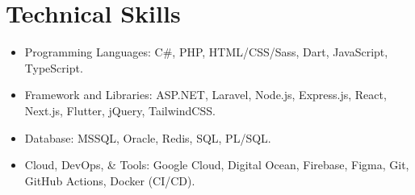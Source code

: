 \section{Technical Skills}

\begin{itemize}[itemsep=1pt, parsep=0pt, topsep=0pt]
    \item Programming Languages: C\#, PHP, HTML/CSS/Sass, Dart, JavaScript, TypeScript.
    \item Framework and Libraries: ASP.NET, Laravel, Node.js, Express.js, React, Next.js, Flutter, jQuery, TailwindCSS.
    \item Database: MSSQL, Oracle, Redis, SQL, PL/SQL.
    \item Cloud, DevOps, \& Tools: Google Cloud, Digital Ocean, Firebase, Figma, Git, GitHub Actions, Docker (CI/CD).
\end{itemize}